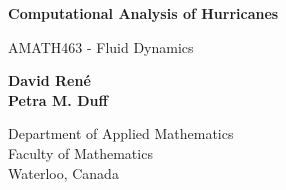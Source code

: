 \begin{titlepage}

\begin{center}
    \vspace*{1cm}
        
    \Huge
    \textbf{Computational Analysis of Hurricanes}
        
    \vspace{0.5cm}
    \LARGE
    AMATH463 - Fluid Dynamics
        
    \vspace{1.5cm}
        
    \textbf{David René}\\
    \textbf{Petra M. Duff} 
    \vfill
        
    \Large
    Department of Applied Mathematics\\
    Faculty of Mathematics\\
    Waterloo, Canada\\
    \date{}
        
\end{center}

\pagebreak

\end{titlepage}